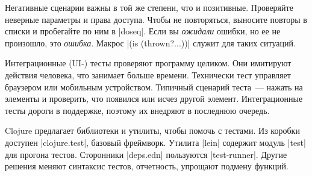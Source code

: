 Негативные сценарии важны в той же степени, что и позитивные. Проверяйте
неверные параметры и права доступа. Чтобы не повторяться, выносите повторы в
списки и пробегайте по ним в \spverb|doseq|.  Если вы \emph{ожидали} ошибки, но
ее не произошло, это \emph{ошибка}. Макрос \spverb|(is (thrown?...))| служит для
таких ситуаций.

Интеграционные (UI-) тесты проверяют программу целиком. Они имитируют действия
человека, что занимает больше времени. Технически тест управляет браузером или
мобильным устройством. Типичный сценарий теста~--- нажать на элементы и
проверить, что появился или исчез другой элемент. Интеграционные тесты дороги в
поддержке, поэтому их внедряют в последнюю очередь.

Clojure предлагает библиотеки и утилиты, чтобы помочь с тестами. Из коробки
доступен \spverb|clojure.test|, базовый фреймворк. Утилита \spverb|lein|
содержит модуль \spverb|test| для прогона тестов. Сторонники \spverb|deps.edn|
пользуются \spverb|test-runner|. Другие решения меняют синтаксис тестов,
отчетность, упрощают подмену функций.
